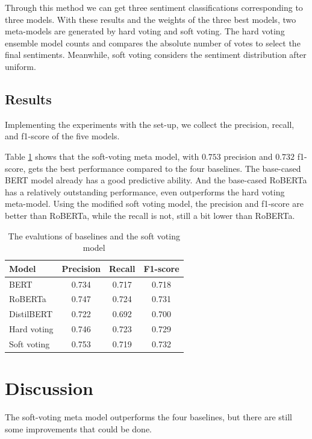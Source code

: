 \documentclass[runningheads]{llncs}
\begin{document}
Through this method we can get three sentiment classifications corresponding to three models. With these results and the weights of the three best models, two meta-models are generated by hard voting and soft voting. The hard voting ensemble model counts and compares the absolute number of votes to select the final sentiments. Meanwhile, soft voting considers the sentiment distribution after uniform.

\subsection{Results}
Implementing the experiments with the set-up, we collect the precision, recall, and f1-score of the five models.

Table \ref{tab:results} shows that the soft-voting meta model, with $0.753$ precision and $0.732$ f1-score, gets the best performance compared to the four baselines. The base-cased BERT model already has a good predictive ability. And the base-cased RoBERTa has a relatively outstanding performance, even outperforms the hard voting meta-model. Using the modified soft voting model, the precision and f1-score are better than RoBERTa, while the recall is not, still a bit lower than RoBERTa.

\begin{table}[ht!]
	\centering
	\caption{The evalutions of baselines and the soft voting model}
	\label{tab:results}
	\begin{tabular}{lccc}
		\toprule
		\textbf{Model}       & \textbf{Precision} & \textbf{Recall} & \textbf{F1-score} \\ 
		\midrule
		BERT        & 0.734     & 0.717  & 0.718    \\
		RoBERTa     & 0.747     & 0.724  & 0.731    \\
		DistilBERT  & 0.722     & 0.692  & 0.700    \\
		Hard voting & 0.746     & 0.723  & 0.729    \\
		Soft voting & 0.753     & 0.719  & 0.732    \\ 
		\bottomrule
	\end{tabular}
\end{table}


\section{Discussion}
The soft-voting meta model outperforms the four baselines, but there are still some improvements that could be done. 
\end{document}
